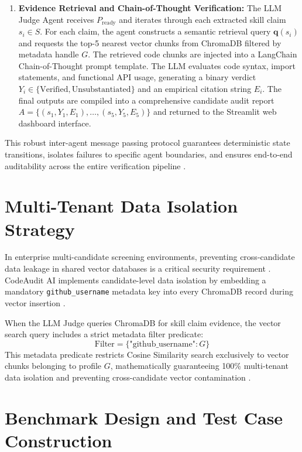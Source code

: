 \begin{enumerate}[leftmargin=*, label=\arabic*.]
    \item \textbf{Evidence Retrieval and Chain-of-Thought Verification:} The LLM Judge Agent receives $P_{\text{ready}}$ and iterates through each extracted skill claim $s_i \in S$. For each claim, the agent constructs a semantic retrieval query $\mathbf{q}(s_i)$ and requests the top-5 nearest vector chunks from ChromaDB filtered by metadata handle $G$. The retrieved code chunks are injected into a LangChain Chain-of-Thought prompt template. The LLM evaluates code syntax, import statements, and functional API usage, generating a binary verdict $Y_i \in \{\text{Verified}, \text{Unsubstantiated}\}$ and an empirical citation string $E_i$. The final outputs are compiled into a comprehensive candidate audit report $A = \{(s_1, Y_1, E_1), \dots, (s_5, Y_5, E_5)\}$ and returned to the Streamlit web dashboard interface.
\end{enumerate}

This robust inter-agent message passing protocol guarantees deterministic state transitions, isolates failures to specific agent boundaries, and ensures end-to-end auditability across the entire verification pipeline \cite{ref10, ref27, ref39}.

\section{Multi-Tenant Data Isolation Strategy}

In enterprise multi-candidate screening environments, preventing cross-candidate data leakage in shared vector databases is a critical security requirement \cite{ref31, ref34}. CodeAudit AI implements candidate-level data isolation by embedding a mandatory \texttt{github\_username} metadata key into every ChromaDB record during vector insertion \cite{ref11}.

When the LLM Judge queries ChromaDB for skill claim evidence, the vector search query includes a strict metadata filter predicate:
\begin{equation}
\text{Filter} = \{\text{"github\_username"}: G\}
\end{equation}
This metadata predicate restricts Cosine Similarity search exclusively to vector chunks belonging to profile $G$, mathematically guaranteeing 100\% multi-tenant data isolation and preventing cross-candidate vector contamination \cite{ref31}.

\section{Benchmark Design and Test Case Construction}

